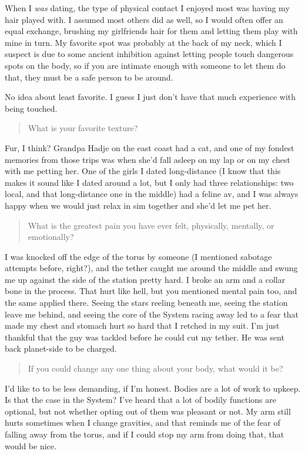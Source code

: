 \noindent When I \emph{was} dating, the type of physical contact I enjoyed most was having my hair played with. I assumed most others did as well, so I would often offer an equal exchange, brushing my girlfriends hair for them and letting them play with mine in turn. My favorite spot was probably at the back of my neck, which I suspect is due to some ancient inhibition against letting people touch dangerous spots on the body, so if you are intimate enough with someone to let them do that, they must be a safe person to be around.

No idea about least favorite. I guess I just don't have that much experience with being touched.

\begin{quote}
What is your favorite texture?
\end{quote}

\noindent Fur, I think? Grandpa Hadje on the east coast had a cat, and one of my fondest memories from those trips was when she'd fall asleep on my lap or on my chest with me petting her. One of the girls I dated long-distance (I know that this makes it sound like I dated around a lot, but I only had three relationships: two local, and that long-distance one in the middle) had a feline av, and I was always happy when we would just relax in sim together and she'd let me pet her.

\begin{quote}
What is the greatest pain you have ever felt, physically, mentally, or emotionally?
\end{quote}

\noindent I was knocked off the edge of the torus by someone (I mentioned sabotage attempts before, right?), and the tether caught me around the middle and swung me up against the side of the station pretty hard. I broke an arm and a collar bone in the process. That hurt like hell, but you mentioned mental pain too, and the same applied there. Seeing the stars reeling beneath me, seeing the station leave me behind, and seeing the core of the System racing away led to a fear that made my chest and stomach hurt so hard that I retched in my suit. I'm just thankful that the guy was tackled before he could cut my tether. He was sent back planet-side to be charged.

\begin{quote}
If you could change any one thing about your body, what would it be?
\end{quote}

\noindent I'd like to to be less demanding, if I'm honest. Bodies are a lot of work to upkeep. Is that the case in the System? I've heard that a lot of bodily functions are optional, but not whether opting out of them was pleasant or not. My arm still hurts sometimes when I change gravities, and that reminds me of the fear of falling away from the torus, and if I could stop my arm from doing that, that would be nice.

